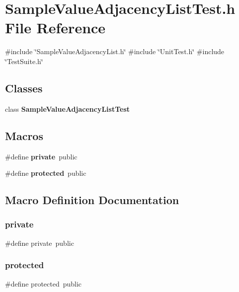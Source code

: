 \section{Sample\+Value\+Adjacency\+List\+Test.\+h File Reference}
\label{SampleValueAdjacencyListTest_8h}
{\ttfamily \#include \char`\"{}Sample\+Value\+Adjacency\+List.\+h\char`\"{}}\newline
{\ttfamily \#include \char`\"{}Unit\+Test.\+h\char`\"{}}\newline
{\ttfamily \#include \char`\"{}Test\+Suite.\+h\char`\"{}}\newline
\subsection*{Classes}
\begin{DoxyCompactItemize}
\item 
class \textbf{ Sample\+Value\+Adjacency\+List\+Test}
\end{DoxyCompactItemize}
\subsection*{Macros}
\begin{DoxyCompactItemize}
\item 
\#define \textbf{ private}~public
\item 
\#define \textbf{ protected}~public
\end{DoxyCompactItemize}


\subsection{Macro Definition Documentation}
\mbox{\label{SampleValueAdjacencyListTest_8h_a6a1d6e1a12975a4e9a0b5b952e79eaad}} 
\subsubsection{private}
{\footnotesize\ttfamily \#define private~public}

\mbox{\label{SampleValueAdjacencyListTest_8h_a363c8dcebb1777654ad1703136a14ec8}} 
\subsubsection{protected}
{\footnotesize\ttfamily \#define protected~public}

